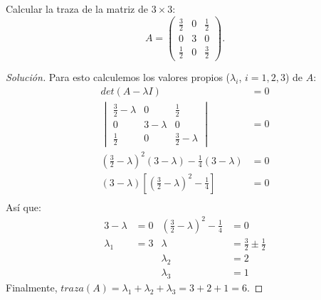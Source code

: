 \documentclass[12pt]{book}
\newenvironment{solution}
  {\renewcommand\qedsymbol{$\square$}\begin{proof}[Solución]}
  {\end{proof}}
\begin{document}
\exercise Calcular la traza de la matriz de $3\times3$:
\[
A=\begin{pmatrix}
\frac{3}{2} & 0 & \frac{1}{2}\\
0 & 3 & 0\\
\frac{1}{2} & 0 & \frac{3}{2}
\end{pmatrix}.
\]
\begin{solution}
Para esto calculemos los valores propios ($\lambda_i$, $i=1, 2, 3$) de $A$:
\begin{align*}
    det(A-\lambda I)&=0\\
    \begin{vmatrix}
\frac{3}{2}-\lambda & 0 & \frac{1}{2}\\
0 & 3-\lambda & 0\\
\frac{1}{2} & 0 & \frac{3}{2}-\lambda
\end{vmatrix} &=0\\
\left(\frac{3}{2}-\lambda\right)^2(3-\lambda)-\frac{1}{4}(3-\lambda)&=0\\
(3-\lambda)\left[\left(\frac{3}{2}-\lambda\right)^2-\frac{1}{4}\right]&=0\\
\end{align*}
Así que:
\begin{align*}
    3-\lambda&=0 & \left(\frac{3}{2}-\lambda\right)^2-\frac{1}{4}&=0\\
    \lambda_1&=3 & \lambda&=\frac{3}{2}\pm\frac{1}{2}\\
    & & \lambda_2&=2\\
    & & \lambda_3&=1
\end{align*}
Finalmente, $traza(A)=\lambda_1+\lambda_2+\lambda_3=3+2+1=6$.
\end{solution}
\end{document}
